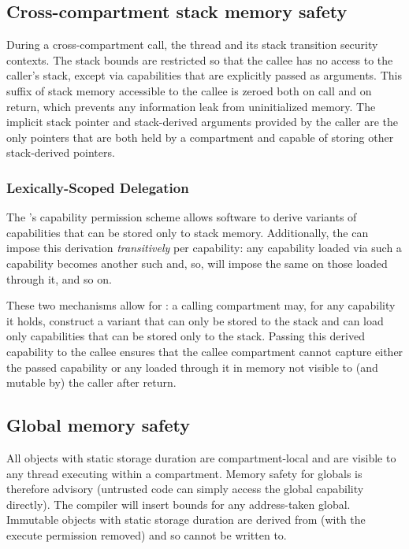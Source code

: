 \subsection{Cross-compartment stack memory safety}

During a cross-compartment call, the thread and its stack transition security contexts.
The stack bounds are restricted so that the callee has no access to the caller's stack, except via capabilities that are explicitly passed as arguments.
This suffix of stack memory accessible to the callee is zeroed both on call and on return, which prevents any information leak from uninitialized memory.
The implicit stack pointer and stack-derived arguments provided by the caller are the only pointers that are both held by a compartment and capable of storing other stack-derived pointers.

\subsubsection{Lexically-Scoped Delegation}

The \cherimcuisa{}'s capability permission scheme allows software to derive variants of capabilities that can be stored only to stack memory.
Additionally, the \cherimcuisa{} can impose this derivation \emph{transitively} per capability: any capability loaded via such a capability becomes another such and, so, will impose the same on those loaded through it, and so on.

These two mechanisms allow for : a calling compartment may, for any capability it holds, construct a variant that can only be stored to the stack and can load only capabilities that can be stored only to the stack.
Passing this derived capability to the callee ensures that the callee compartment cannot capture either the passed capability or any loaded through it in memory not visible to (and mutable by) the caller after return.


\subsection{Global memory safety}
All objects with static storage duration are compartment-local and are visible to any thread executing within a compartment.
Memory safety for globals is therefore advisory (untrusted code can simply access the global capability directly).
The compiler will insert bounds for any address-taken global.
Immutable objects with static storage duration are derived from \PCC{} (with the execute permission removed) and so cannot be written to.

